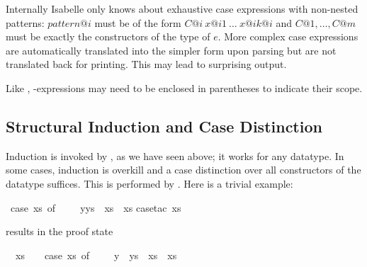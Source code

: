 \begin{isabellebody}
\begin{isamarkuptext}
\begin{warn}
Internally Isabelle only knows about exhaustive case expressions with
non-nested patterns: $pattern@i$ must be of the form
$C@i~x@ {i1}~\dots~x@ {ik@i}$ and $C@1, \dots, C@m$ must be exactly the
constructors of the type of $e$.
%
More complex case expressions are automatically
translated into the simpler form upon parsing but are not translated
back for printing. This may lead to surprising output.
\end{warn}

\begin{warn}
Like , -expressions may need to be enclosed in
parentheses to indicate their scope.
\end{warn}

\subsection{Structural Induction and Case Distinction}
\label{sec:struct-ind-case}
%
Induction is invoked by , as we have seen above; 
it works for any datatype.  In some cases, induction is overkill and a case
distinction over all constructors of the datatype suffices.  This is performed
by .  Here is a trivial example:%
\end{isamarkuptext}%
\isamarkuptrue%
\isamarkupfalse%
\ {}{}case\ xs\ of\ {}{}\ {}\ {}{}\ {}\ y{}ys\ {}\ xs{}\ {}\ xs{}\isanewline
%
\isadelimproof
%
\endisadelimproof
%
\isatagproof
{}\isamarkupfalse%
{}case{}tac\ xs{}%
\begin{isamarkuptxt}%
\noindent
results in the proof state
\begin{isabelle}%
\ {}{}\ xs\ {}\ {}{}\ {}\ {}case\ xs\ of\ {}{}\ {}\ {}{}\ {}\ y\ {}\ ys\ {}\ xs{}\ {}\ xs\isanewline

\end{isabelle}
\end{isamarkuptxt}
\end{isabellebody}
